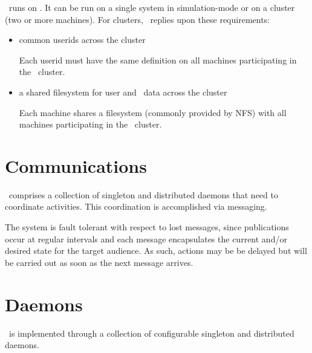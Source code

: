     \varDUCC~runs on \varLinux. It can be run on a single system in simulation-mode
    or on a cluster (two or more machines). For clusters, \varDUCC~replies upon 
    these requirements:
    
    \begin{itemize}
      \item common userids across the cluster
      
      Each userid must have the same definition on all machines participating
      in the \varDUCC~cluster.
      
      \item a shared filesystem for user and \varDUCC~data across the cluster
      
      Each machine shares a filesystem (commonly provided by NFS) with all 
      machines participating in the \varDUCC~cluster.
      
    \end{itemize} 
    
    \section{Communications}
    
    \varDUCC~comprises a collection of singleton and distributed daemons that need
    to coordinate activities.  This coordination is accomplished via messaging.
    
    The system is fault tolerant with respect to lost messages, since
    publications occur at regular intervals and each message encapsulates
    the current and/or desired state for the target audience.
    As such, actions may be be delayed but will be carried out as soon as the
    next message arrives.
    
    \section{Daemons}
    
    \varDUCC~is implemented through a collection of configurable singleton 
    and distributed daemons.
    
    
    
    
    
    
    
    
    
    
